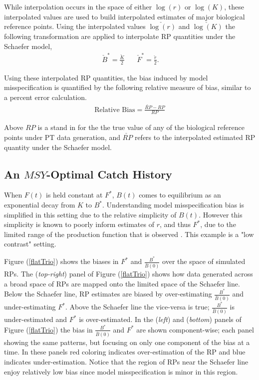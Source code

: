 \documentclass[12pt]{article}
\begin{document}
{\color{gray}
%
While interpolation occurs in the space of either $\log(r)$ or $\log(K)$, these 
interpolated values are used to build interpolated estimates of major biological 
reference points. Using the interpolated values $\check{\log(r)}$ and $\check{\log(K)}$
the following transformation are applied to interpolate RP quantities under the Schaefer 
model,
%
\begin{align}~
        \check B^* = \frac{\check K}{2} ~~~~~~~~
	\check F^* = \frac{\check r}{2}.  %
\end{align}

%
Using these interpolated RP quantities, the bias induced by model misspecification is 
quantified by the following relative measure of bias, similar to a percent error calculation.
%
\begin{align}
\text{Relative Bias} = \frac{\check{RP}-RP}{RP}
\end{align}

%
Above $RP$ is a stand in for the the true value of any of the biological 
reference points under PT data generation, and $\check{RP}$ refers to the 
interpolated estimated RP quantity under the Schaefer model.

\subsection{An $MSY$-Optimal Catch History \label{flat}}

%
When $F(t)$ is held constant at $F^*$, $B(t)$ comes to equilibrium as an 
exponential decay from $K$ to $B^*$. Understanding model misspecification bias 
is simplified in this setting due to the relative simplicity of $B(t)$. 
However this simplicity is known to poorly inform estimates of $r$, and thus $F^*$, 
due to the limited range of the production function that is observed . 
This example is a "low contrast" setting.

%
Figure (\ref{flatTrio}) shows the biases in $F^*$ and $\frac{B^*}{\bar B(0)}$ 
over the space of simulated RPs. The (\emph{top-right}) panel of Figure (\ref{flatTrio}) 
shows how data generated across a broad space of RPs are mapped onto the 
limited space of the Schaefer line. Below the Schaefer line, RP estimates are 
biased by over-estimating $\frac{B^*}{\bar B(0)}$ and under-estimating $F^*$. 
Above the Schaefer line the vice-versa is true; $\frac{B^*}{\bar B(0)}$ is 
under-estimated and $F^*$ is over-estimated. In the (\emph{left}) and 
(\emph{bottom}) panels of Figure (\ref{flatTrio}) the bias in $\frac{B^*}{\bar B(0)}$ 
and $F^*$ are shown component-wise; each panel showing the same patterns, but 
focusing on only one component of the bias at a time. In these panels red 
coloring indicates over-estimation of the RP and blue indicates under-estimation. 
Notice that the region of RPs near the Schaefer line enjoy relatively low bias 
since model misspecification is minor in this region.  

}
\end{document}
